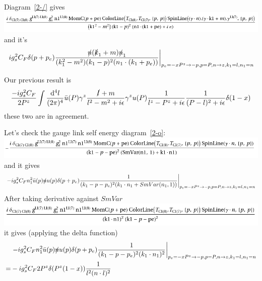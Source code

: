 \documentclass{article}
\newcommand{\mm}[1]{\frac{\dd^4#1}{(2\pi)^4}}
\begin{document}
Diagram~\ref{2-/} gives\\
	\includegraphics[width=\linewidth]{image5.png}
\\and it's
\begin{align}
	\eval{ig_s^2C_F\delta(p+p_e)\frac{\slashed n (\slashed{k}_1+m)\slashed n_1}{(k_1^2-m^2)(k_1-p)^2(n_1\cdot(k_1+p_e))}}_{p_e=-x P^z\to -p,p=P,n\to z,k_1=l,n_1=n}
\end{align}

Our previous result is
\begin{align}
	\frac{-ig_s^2C_F}{2P^z}\int\mm{l}\bar u(P)\gamma^z\frac{\slashed l+m}{l^2-m^2+i\epsilon}\gamma^zu(P)\frac{1}{l^z-P^z+i\epsilon}\frac{1}{(P-l)^2+i\epsilon}\delta(1-x)
\end{align}
these two are in agreement.

Let's check the gauge link self energy diagram~\ref{2-o}: \\
	\includegraphics[width=\linewidth]{image6.png}
\\and it gives
\begin{align}
	\eval{-ig_s^2C_Fn_1^2\bar u(p)\slashed{n} u(p) \delta(p+p_e)\frac{1}{(k_1-p-p_e)^2(k_1 \cdot n_1 +SmVar(n_1,1))}}_{p_e=-x P^z\to -p,p=P,n\to z,k_1=l,n_1=n}
\end{align}
After taking derivative against $SmVar$\\
	\includegraphics[width=\linewidth]{image8.png}
\\it gives (applying the delta function)
\begin{align}
	&\eval{-ig_s^2C_Fn_1^2\bar u(p)\slashed{n} u(p) \delta(p+p_e)\frac{1}{(k_1-p-p_e)^2(k_1 \cdot n_1 )^2}}_{p_e=-x P^z\to -p,p=P,n\to z,k_1=l,n_1=n}\\
	=&-ig_s^2C_F 2P^z \delta(P^z(1-x))\frac{1}{l^2(n \cdot l )^2}
\end{align}
\end{document}
